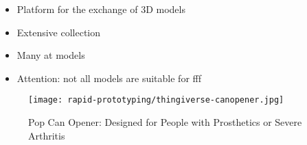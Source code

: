 \begin{frame}
    \begin{itemize}
        \item Platform for the exchange of 3D models
        \item Extensive collection
        \item Many \acs{at} models
        \item Attention: not all models are suitable for \acs{fff}
    \end{itemize}
    \begin{figure}
        \texttt{[image: rapid-prototyping/thingiverse-canopener.jpg]}
        \caption{Pop Can Opener: Designed for People with Prosthetics or Severe Arthritis}
    \end{figure}
\end{frame}
